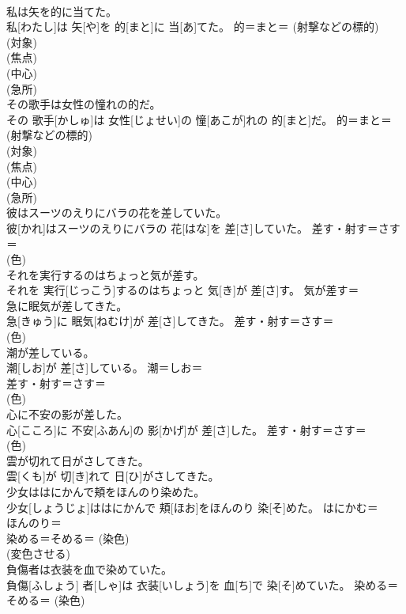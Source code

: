 \documentclass[8pt]{extreport}
\begin{document}
\begin{CJK}{UTF8}{min}
{\\	私は矢を的に当てた。	
\\	私[わたし]は 矢[や]を 的[まと]に 当[あ]てた。	的＝まと＝ (射撃などの標的) 
\\	(対象) 
\\	(焦点) 
\\	(中心) 
\\	(急所) 
\\	その歌手は女性の憧れの的だ。	
\\	その 歌手[かしゅ]は 女性[じょせい]の 憧[あこが]れの 的[まと]だ。	的＝まと＝ (射撃などの標的) 
\\	(対象) 
\\	(焦点) 
\\	(中心) 
\\	(急所) 
\\	彼はスーツのえりにバラの花を差していた。	
\\	彼[かれ]はスーツのえりにバラの 花[はな]を 差[さ]していた。	差す・射す＝さす＝ 
\\	(色) 
\\	それを実行するのはちょっと気が差す。	
\\	それを 実行[じっこう]するのはちょっと 気[き]が 差[さ]す。	気が差す＝ 
\\	急に眠気が差してきた。	
\\	急[きゅう]に 眠気[ねむけ]が 差[さ]してきた。	差す・射す＝さす＝ 
\\	(色) 
\\	潮が差している。	
\\	潮[しお]が 差[さ]している。	潮＝しお＝ 
\\	差す・射す＝さす＝ 
\\	(色) 
\\	心に不安の影が差した。	
\\	心[こころ]に 不安[ふあん]の 影[かげ]が 差[さ]した。	差す・射す＝さす＝ 
\\	(色) 
\\	雲が切れて日がさしてきた。	
\\	雲[くも]が 切[き]れて 日[ひ]がさしてきた。	
\\	少女ははにかんで頬をほんのり染めた。	
\\	少女[しょうじょ]ははにかんで 頬[ほお]をほんのり 染[そ]めた。	はにかむ＝ 
\\	ほんのり＝ 
\\	染める＝そめる＝ (染色) 
\\	(変色させる) 
\\	負傷者は衣装を血で染めていた。	
\\	負傷[ふしょう] 者[しゃ]は 衣装[いしょう]を 血[ち]で 染[そ]めていた。	染める＝そめる＝ (染色) 
}
\end{CJK}
\end{document}
